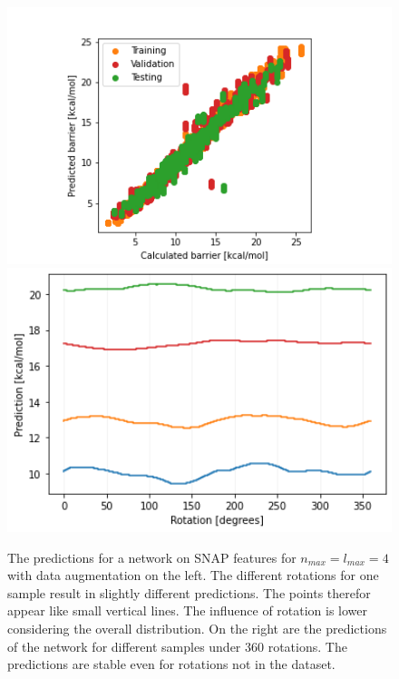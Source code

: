 \begin{figure}[!htb]
    \includegraphics[width=1.0\textwidth]{figures/regression/snap/scatter_SNAP_4_4.png}
  \endminipage\hfill
    \includegraphics[width=1.0\textwidth]{figures/regression/snap/rotation.png}
  \endminipage\hfill
  \caption{
  The predictions for a network on SNAP features for $n_{max}=l_{max}=4$ with data augmentation on the left.
  The different rotations for one sample result in slightly different predictions. The points therefor appear like small vertical 
  lines. The influence of rotation is lower considering the overall distribution. 
  On the right are the predictions of the network for different samples under 360 rotations.
  The predictions are stable even for rotations not in the dataset.
  }
  \label{fig:snap_roation}
\end{figure}

